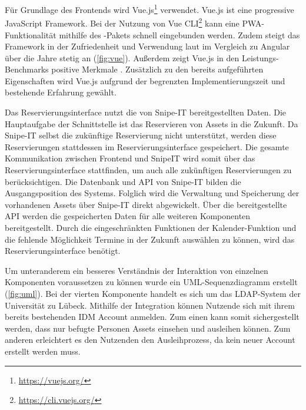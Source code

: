 Für Grundlage des Frontends wird Vue.js\footnote{\url{https://vuejs.org/}} verwendet. Vue.js ist
eine progressive JavaScript Framework. Bei der Nutzung von Vue
CLI\footnote{\url{https://cli.vuejs.org/}} kann eine PWA-Funktionalität mithilfe des
-Pakets schnell eingebunden werden. Zudem steigt das Framework in
der Zufriedenheit und Verwendung laut  im Vergleich zu Angular über die Jahre
stetig an (\ref{fig:vue}). Außerdem zeigt Vue.js in den Leistungs-Benchmarks positive Merkmale
. Zusätzlich zu den bereits aufgeführten Eigenschaften wird Vue.js aufgrund der
begrenzten Implementierungszeit und bestehende Erfahrung gewählt.

Das Reservierungsinterface nutzt die von Snipe-IT bereitgestellten Daten. Die Hauptaufgabe der
Schnittstelle ist das Reservieren von Assets in die Zukunft. Da Snipe-IT selbst die zukünftige
Reservierung nicht unterstützt, werden diese Reservierungen stattdessen im Reservierungsinterface
gespeichert. Die gesamte Kommunikation zwischen Frontend und SnipeIT wird somit über das
Reservierungsinterface stattfinden, um auch alle zukünftigen Reservierungen zu berücksichtigen. Die
Datenbank und API von Snipe-IT bilden die Ausgangsposition des Systems. Folglich wird die Verwaltung
und Speicherung der vorhandenen Assets über Snipe-IT direkt abgewickelt. Über die bereitgestellte
API werden die gespeicherten Daten für alle weiteren Komponenten bereitgestellt. Durch die
eingeschränkten Funktionen der Kalender-Funktion und die fehlende Möglichkeit Termine in der Zukunft
auswählen zu können, wird das Reservierungsinterface benötigt.

Um unteranderem ein besseres Verständnis der Interaktion von einzelnen Komponenten voraussetzen zu können wurde
ein UML-Sequenzdiagramm erstellt (\ref{fig:uml}). Bei der vierten Komponente handelt es sich um das
LDAP-System der Universität zu Lübeck. Mithilfe der Integration können Nutzende sich mit ihrem bereits
bestehenden IDM Account anmelden. Zum einen kann somit sichergestellt werden, dass nur befugte
Personen Assets einsehen und ausleihen können. Zum anderen erleichtert es den Nutzenden den
Ausleihprozess, da kein neuer Account erstellt werden muss.


